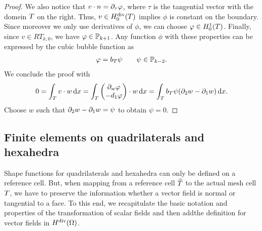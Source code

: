 \begin{proof}
 We also notice that $v\cdot n = \d_{\tau} \phi$, where $\tau$ is the
 tangential vector with the domein $\cell$ on the right. Thus,
 $v\in \Hdiv_0(\cell)$ implies $\phi$ is constant on the
 boundary. Since moreover we only use derivatives of $\phi$, we can
 choose $\phi \in H^1_0(\cell)$. Finally, since $v\in RT_{k,0}$, we
 have $\phi\in\P_{k+1}$. Any function $\phi$ with these properties can
 be expressed by the cubic bubble function as
 \begin{gather*}
   \phi = b_\cell \psi \qquad\psi\in \P_{k-2}.
 \end{gather*}
We conclude the proof with
\begin{gather*}
  0 = \int_\cell v\cdot w \dx = \int_\cell
  \begin{pmatrix}
    \d_w\phi\\-d_1\phi
  \end{pmatrix}\cdot w\dx
  = \int_\cell b_\cell \psi (\d_2 w - \d_1 w)\dx.
\end{gather*}
Choose $w$ such that $\d_2 w-\d_1 w = \psi$ to obtain $\psi=0$.
\end{proof}


\subsection{Finite elements on quadrilaterals and hexahedra}

\begin{intro}
  Shape functions for quadrilaterals and hexahedra can only be defined
  on a reference cell. But, when mapping from a reference cell
  $\refcell$ to the actual mesh cell $\cell$, we have to preserve the
  information whether a vector field is normal or tangential to a
  face. To this end, we recapitulate the basic notation and properties
  of the transformation of scalar fields and then addthe definition
  for vector fields in $\Hdiv(\domain)$.
\end{intro}

